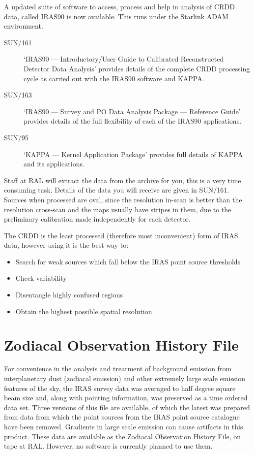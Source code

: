 A updated suite of software to access, process and help in analysis of CRDD
data, called IRAS90 is now available. This runs under the Starlink ADAM
environment.
\begin{description}
\item [SUN/161] `IRAS90 --- Introductory/User Guide to Calibrated
Reconstructed Detector Data Analysis' provides details of the complete CRDD
processing cycle as carried out with the IRAS90 software and KAPPA.
\item [SUN/163] `IRAS90 --- Survey and PO Data Analysis Package --- Reference
Guide' provides details of the full flexibility of each of the IRAS90
applications.
\item [SUN/95] `KAPPA --- Kernel Application Package' provides full details of
KAPPA and its applications.
\end{description}

Staff at RAL will extract the data from the archive for you, this is a very
time consuming task. Details of the data you will receive are given in SUN/161.
Sources when processed are oval, since the resolution in-scan is better than the
resolution cross-scan and the maps usually have stripes in them, due to the
preliminary calibration made independently for each detector.

The CRDD is the least processed (therefore most inconvenient) form of IRAS data,
however using it is the best way to:
\begin{itemize}
\item Search for weak sources which fall below the IRAS point source thresholds
\item Check variability
\item Disentangle highly confused regions
\item Obtain the highest possible spatial resolution
\end{itemize}

\section{Zodiacal Observation History File}
\label{m:zodiac}
For convenience in the analysis and treatment of background emission from
interplanetary dust (zodiacal emission) and other extremely large scale emission
features of the sky, the IRAS survey data was averaged to half degree square
beam size and, along with pointing information, was preserved as a time ordered
data set.
Three versions of this file are available, of which the latest was prepared from
data from which the point sources from the IRAS point source catalogue have been
removed. Gradients in large scale emission can cause artifacts in this product.
These data are available as the Zodiacal Observation History File, on tape at 
RAL. However, no software is currently planned to use them.

